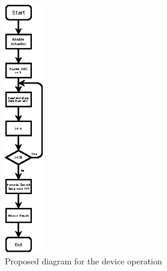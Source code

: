 \begin{figure}[!htb]
    \centering
    \includegraphics[width=0.15\textwidth]{Chapters/3CHP/Images/fluxogramArchProp.eps}
    \caption{Proposed diagram for the device operation}
    \label{fig:systemSWFlow}
\end{figure}


